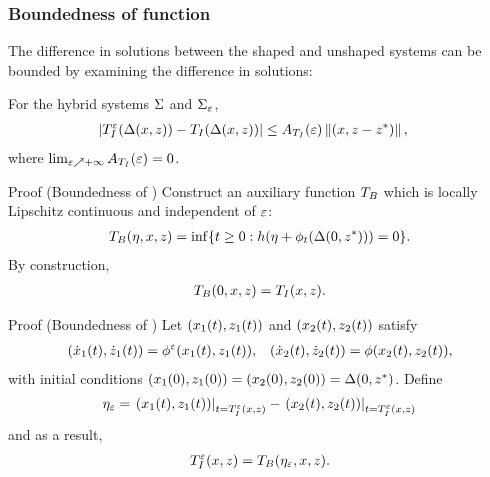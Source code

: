 \begin{frame}[t]
  \frametitle{Boundedness of \TtI{} function}
   {
    The difference in solutions between the shaped and unshaped systems can be
    bounded by examining the difference in solutions:
    \begin{lemma}
      For the hybrid systems $\Sigma$ and $\Sigma_{\varepsilon}$,
      \begin{eqnarray}
        \nonumber
        &| T_{I}^{\varepsilon}(\Delta(x, z)) - T_{I}(\Delta(x, z)) | \leq A_{T_{I}}(\varepsilon) \left\|(x, z - z^{*})\right\|,
      \end{eqnarray}
      where $\lim_{\varepsilon \nearrow +\infty} A_{T_{I}}(\varepsilon) = 0$.
    \end{lemma}
  }
   {
    \begin{block}{Proof (Boundedness of \TtI{})}
      Construct an auxiliary \tti{} function $T_{B}$ which is locally Lipschitz
      continuous and independent of $\varepsilon$:
      \begin{align*}
        T_{B}(\eta, x, z) = \inf\{t \geq 0 : h(\eta + \phi_{t}(\Delta(0, z^{*}))) = 0\}.
      \end{align*}
      By construction,
      \begin{align*}
        T_{B}(0, x, z) = T_{I}(x, z).
      \end{align*}
    \end{block}
  }

   {
    \begin{block}{Proof (Boundedness of \TtI{})}
      Let $(x_{1}(t), z_{1}(t))$ and $(x_{2}(t), z_{2}(t))$ satisfy\vspace{-.4em}
      \begin{align*}
        ({\dot {x}}_{1}(t), {\dot {z}}_{1}(t)) = \phi^{\varepsilon}(x_{1}(t), z_{1}(t)), && ({\dot {x}}_{2}(t), {\dot {z}}_{2}(t)) =
        \phi(x_{2}(t), z_{2}(t)),
      \end{align*}
      with initial conditions $(x_{1}(0), z_{1}(0)) = (x_{2}(0), z_{2}(0)) = \Delta(0,
      z^{*})$. Define
      \begin{align*}
        \eta_{\varepsilon} = \left.(x_{1}(t), z_{1}(t))\right|_{t = T_{I}^{\varepsilon}(x, z)} -
        \left.(x_{2}(t), z_{2}(t))\right|_{t = T_{I}^{\varepsilon}(x, z)}
      \end{align*}
      and as a result,\vspace{-.4em}
      \begin{align*}
        T_{I}^{\varepsilon}(x, z) = T_{B}(\eta_{\varepsilon}, x, z).
      \end{align*}

    \end{block}
  }
  

\end{frame}
